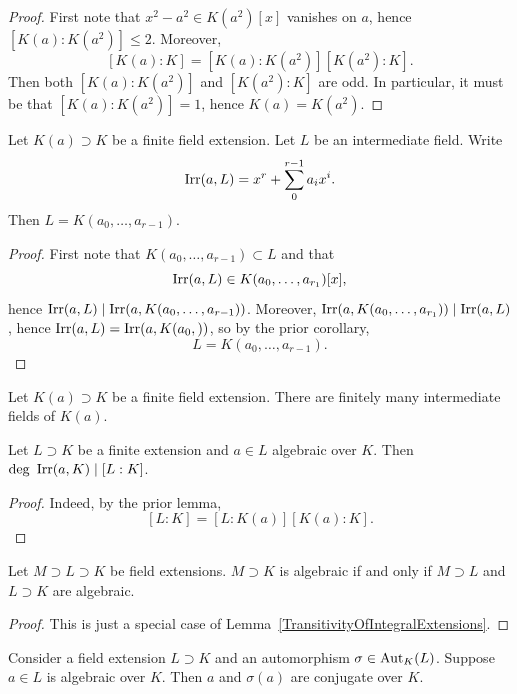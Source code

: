     \begin{proof}
        First note that $x^2-a^2\in K(a^2)[x]$ vanishes on $a$, hence $[K(a):K(a^2)]\leq 2$. Moreover, 
        $$
            [K(a):K] = [K(a):K(a^2)][K(a^2):K].
        $$
        Then both $[K(a) : K(a^2)]$ and $[K(a^2):K]$ are odd. In particular, it must be that $[K(a) : K(a^2)]=1$, hence $K(a) = K(a^2)$. 
    \end{proof}
    \begin{corollary}
        Let $K(a) \supset K$ be a finite field extension. Let $L$ be an intermediate field. Write 
        $$
            \mathrm{Irr}(a,L) = x^r + \sum_0^{r-1} a_i x^i. 
        $$
        Then $L=K(a_0,\dots,a_{r-1})$. 
    \end{corollary}
    \begin{proof}
        First note that $K(a_0,\dots,a_{r-1})\subset L$ and that 
        $$
            \mathrm{Irr}(a,L) \in K(a_0,\dots,a_{r_1})[x],
        $$
        hence $\mathrm{Irr}(a,L)\mid \mathrm{Irr}(a,K(a_0,\dots,a_{r-1}))$. Moreover, $\mathrm{Irr}(a,K(a_0,\dots,a_{r_1}))\mid \mathrm{Irr}(a,L)$, hence $\mathrm{Irr}(a,L)=\mathrm{Irr}(a,K(a_0,))$, so by the prior corollary, 
        $$L= K(a_0,\dots,a_{r-1}).$$
    \end{proof}
    \begin{corollary}
        Let $K(a) \supset K$ be a finite field extension. There are finitely many intermediate fields of $K(a)$.
    \end{corollary}
    \begin{lemma}
        Let $L\supset K$ be a finite extension and $a\in L$ algebraic over $K$. Then $\deg \ \mathrm{Irr}(a,K) \mid [L:K]$.
    \end{lemma}
    \begin{proof}
        Indeed, by the prior lemma,
        $$
            [L : K] = [L : K(a)][K(a) : K]. 
        $$
    \end{proof}
    \begin{lemma}\label{TowerOfExtensionAlgebraicTransitiveAndSentitiveToIntermediateField}
        Let $M\supset L \supset K$ be field extensions. $M\supset K$ is algebraic if and only if $M\supset L$ and $L\supset K$ are algebraic.
    \end{lemma}
    \begin{proof}
        This is just a special case of Lemma~\ref{TransitivityOfIntegralExtensions}.
    \end{proof}
    \begin{lemma}\label{AutomorphismTakesConjugatesToConjugates}
        Consider a field extension $L\supset K$ and an automorphism $\sigma\in \mathrm{Aut}_K(L)$. Suppose $a\in L$ is algebraic over $K$. Then $a$ and $\sigma(a)$ are conjugate over $K$.  
    \end{lemma}
